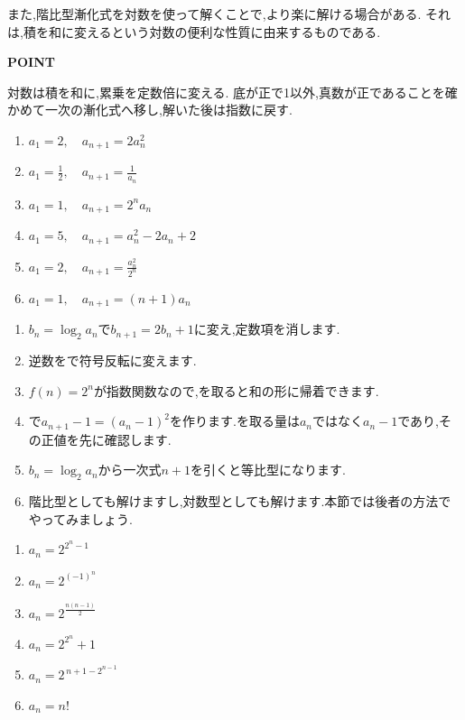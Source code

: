   また,階比型漸化式を対数を使って解くことで,より楽に解ける場合がある.
  それは,積を和に変えるという対数の便利な性質に由来するものである.

  \begin{bookpoint}
    \textbf{POINT}\par
    対数は積を和に,累乗を定数倍に変える.
    底が正で1以外,真数が正であることを確かめて一次の漸化式へ移し,解いた後は指数に戻す.
  \end{bookpoint}
  
  \noindent{}\par\nobreak
  \begin{enumerate}[label=(\arabic*),parsep=3pt,format=\bookitemlink{example-logarithmic-1}{problem}{hint}]
    \item $a_1=2,\quad a_{n+1}=2a_n^2$
    \item $a_1=\frac{1}{2},\quad a_{n+1}=\frac{1}{a_n}$
    \item $a_1=1,\quad a_{n+1}=2^na_n$
    \item $a_1=5,\quad a_{n+1}=a_n^2-2a_n+2$
    \item $a_1=2,\quad a_{n+1}=\frac{a_n^2}{2^n}$
    \item $a_1=1,\quad a_{n+1}=(n+1)a_n$
  \end{enumerate}
  
  \noindent{}\par\nobreak
  \begin{enumerate}[label=(\arabic*),parsep=3pt,format=\bookitemlink{example-logarithmic-1}{hint}{answer}]
    \item $b_n=\log_2a_n$で$b_{n+1}=2b_n+1$に変え,定数項を消します.
    \item 逆数をで符号反転に変えます.
    \item $f(n)=2^n$が指数関数なので,を取ると和の形に帰着できます.
    \item {}で$a_{n+1}-1=(a_n-1)^2$を作ります.を取る量は$a_n$ではなく$a_n-1$であり,その正値を先に確認します.
    \item $b_n=\log_2a_n$から一次式$n+1$を引くと等比型になります.
    \item 階比型としても解けますし,対数型としても解けます.本節では後者の方法でやってみましょう.
  \end{enumerate}
  
  \noindent{}\par\nobreak
  \begin{enumerate}[label=(\arabic*),parsep=3pt,format=\bookitemlink{example-logarithmic-1}{answer}{solution}]
    \item $a_n=2^{2^{n}-1}$
    \item $a_n=2^{(-1)^{n}}$
    \item $a_n=2^{\frac{n(n-1)}{2}}$
    \item $a_n=2^{2^n}+1$
    \item $a_n=2^{\,n+1-2^{n-1}}$
    \item $a_n=n!$
  \end{enumerate}
  
